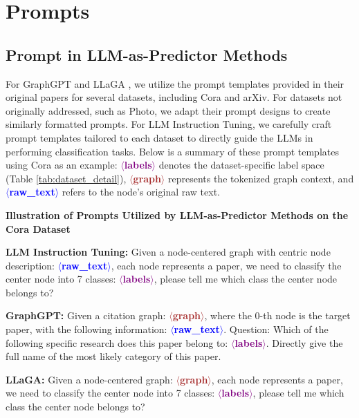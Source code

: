\section{Prompts}

\subsection{Prompt in LLM-as-Predictor Methods}\label{sec:predictor_prompt}
For GraphGPT \cite{tang2023graphgpt} and LLaGA \cite{chen23llaga}, we utilize the prompt templates provided in their original papers for several datasets, including Cora and arXiv. For datasets not originally addressed, such as Photo, we adapt their prompt designs to create similarly formatted prompts. For LLM Instruction Tuning, we carefully craft prompt templates tailored to each dataset to directly guide the LLMs in performing classification tasks. Below is a summary of these prompt templates using Cora as an example: \textcolor{purple}{\textbf{$\langle$labels$\rangle$}} denotes the dataset-specific label space (Table \ref{tab:dataset_detail}), \textcolor{brown}{\textbf{$\langle$graph$\rangle$}} represents the tokenized graph context, and \textcolor{blue}{\textbf{$\langle$raw\_text$\rangle$}} refers to the node's original raw text.

\begin{tcolorbox}[colback=gray!10, colframe=black, boxrule=1pt, arc=2pt, left=5pt, right=5pt]

\textbf{Illustration of Prompts Utilized by LLM-as-Predictor Methods on the Cora Dataset} \vspace*{5pt}
\small

\textbf{LLM Instruction Tuning:} { 
Given a node-centered graph with centric node description: \textcolor{blue}{\textbf{$\langle$raw\_text$\rangle$}}, each node represents a paper, we need to classify the center node into 7 classes: \textcolor{purple}{\textbf{$\langle$labels$\rangle$}}, please tell me which class the center node belongs to?
} \vspace*{3pt}

\textbf{GraphGPT:} {
Given a citation graph: \textcolor{brown}{\textbf{$\langle$graph$\rangle$}}, where the 0-th node is the target paper, with the following information: \textcolor{blue}{\textbf{$\langle$raw\_text$\rangle$}}. Question: Which of the following specific research does this paper belong to: \textcolor{purple}{\textbf{$\langle$labels$\rangle$}}. Directly give the full name of the most likely category of this paper.
} \vspace*{3pt}


\textbf{LLaGA:} {
  Given a node-centered graph: \textcolor{brown}{\textbf{$\langle$graph$\rangle$}}, each node represents a paper, we need to classify the center node into 7 classes: \textcolor{purple}{\textbf{$\langle$labels$\rangle$}}, please tell me which class the center node belongs to?
}  
\end{tcolorbox}




